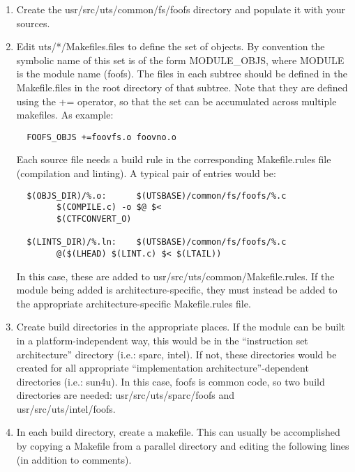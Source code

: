 \documentclass{article}
\begin{document}
\begin{enumerate}
\item Create the usr/src/uts/common/fs/foofs directory and populate it with your
  sources.

\item Edit uts/*/Makefiles.files to define the set of objects. By convention the
  symbolic name of this set is of the form MODULE\_OBJS, where MODULE is the
  module name (foofs). The files in each subtree should be defined in the
  Makefile.files in the root directory of that subtree. Note that they are
  defined using the += operator, so that the set can be accumulated across
  multiple makefiles. As example:

\begin{verbatim}
  FOOFS_OBJS +=foovfs.o foovno.o
\end{verbatim}

  \vspace{0.1cm}
  Each source file needs a build rule in the corresponding Makefile.rules file
  (compilation and linting). A typical pair of entries would be:

\begin{verbatim}
  $(OBJS_DIR)/%.o:      $(UTSBASE)/common/fs/foofs/%.c
        $(COMPILE.c) -o $@ $<
        $(CTFCONVERT_O)

  $(LINTS_DIR)/%.ln:    $(UTSBASE)/common/fs/foofs/%.c
        @($(LHEAD) $(LINT.c) $< $(LTAIL))
\end{verbatim}

  \vspace{0.1cm}
  In this case, these are added to usr/src/uts/common/Makefile.rules. If the
  module being added is architecture-specific, they must instead be added to the
  appropriate architecture-specific Makefile.rules file.

\item Create build directories in the appropriate places. If the module can be
  built in a platform-independent way, this would be in the ``instruction set
  architecture'' directory (i.e.: sparc, intel). If not, these directories would
  be created for all appropriate ``implementation architecture''-dependent
  directories (i.e.: sun4u). In this case, foofs is common code, so two build
  directories are needed: usr/src/uts/sparc/foofs and \\ usr/src/uts/intel/foofs.

\item In each build directory, create a makefile. This can usually be accomplished
  by copying a Makefile from a parallel directory and editing the following lines
  (in addition to comments).


\end{enumerate}
\end{document}
